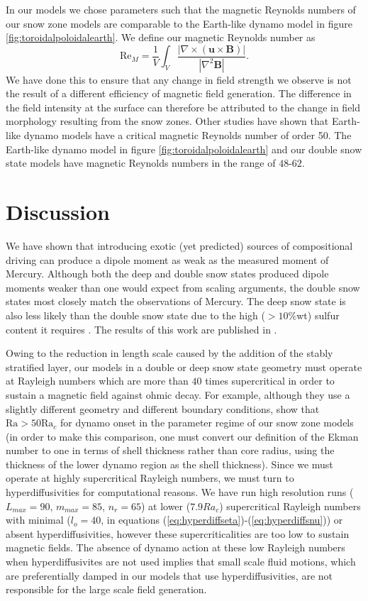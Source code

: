 In our models we chose parameters such that the magnetic Reynolds numbers of our snow zone models are comparable to the Earth-like dynamo model in figure \ref{fig:toroidalpoloidalearth}. We define our magnetic Reynolds number as
\begin{equation}
\mathrm{Re}_{M}=\frac{1}{V}\int_{V}\frac{\left|\nabla\times\left(\mathbf{u}\times\mathbf{B}\right)\right|}{\left|\nabla^{2}\mathbf{B}\right|}.
\end{equation}
We have done this to ensure that any change in field strength we observe is not the result of a different efficiency of magnetic field generation. The difference in the field intensity at the surface can therefore be attributed to the change in field morphology resulting from the snow zones. Other studies  \citep{christensen06scaling} have shown that Earth-like dynamo models have a critical magnetic Reynolds number of order 50. The Earth-like dynamo model in figure \ref{fig:toroidalpoloidalearth} and our double snow state models have magnetic Reynolds numbers in the range of $48$-$62$.

\section{Discussion}
We have shown that introducing exotic (yet predicted) sources of compositional driving can produce a dipole moment as weak as the measured moment of Mercury. Although both the deep and double snow states produced dipole moments weaker than one would expect from scaling arguments, the double snow states most closely match the observations of Mercury. The deep snow state is also less likely than the double snow state due to the high ($>10\%$wt) sulfur content it requires \citep{rivoldini09}. The results of this work are published in \citet{vilim2010}.

Owing to the reduction in length scale caused by the addition of the stably stratified layer, our models in a double or deep snow state geometry must operate at Rayleigh numbers which are more than $40$ times supercritical in order to sustain a magnetic field against ohmic decay. For example, although they use a slightly different geometry and different boundary conditions, \citet{christensen06} show that $\mathrm{Ra}>50\mathrm{Ra}_{c}$ for dynamo onset in the parameter regime of our snow zone models (in order to make this comparison, one must convert our definition of the Ekman number to one in terms of shell thickness rather than core radius, using the thickness of the lower dynamo region as the shell thickness). Since we must operate at highly supercritical Rayleigh numbers, we must turn to hyperdiffusivities for computational reasons. We have run high resolution runs  ($L_{max}=90$, $m_{max}=85$, $n_{r}=65$) at lower ($7.9 Ra_{c}$) supercritical Rayleigh numbers with minimal ($l_{o}=40$, in equations (\ref{eq:hyperdiffseta})-(\ref{eq:hyperdiffsnu})) or absent hyperdiffusivities, however these supercriticalities are too low to sustain magnetic fields. The absence of dynamo action at these low Rayleigh numbers when hyperdiffusivites are not used implies that small scale fluid motions, which are preferentially damped in our models that use hyperdiffusivities, are not responsible for the large scale field generation.


